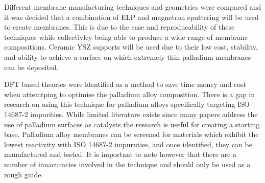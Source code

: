 Different membrane manufacturing techniques and geometries were compared and it was decided that a combination of ELP and magnetron sputtering will be used to create membranes. This is due to the ease and reproducability of these techniques while collectivley being able to produce a wide range of membrane compositions. Ceramic YSZ supports will be used due to their low cost, stability, and ability to achieve a surface on which extremely thin palladium membranes can be deposited.  

DFT based theories were identified as a method to save time money and cost when attemtping to optimise the palladium alloy composition. There is a gap in research on using this technique for palladium alloys specifically targeting ISO 14687-2 impurities. While limited literature exists since many papers address the use of palladium surfaces as catalysts the research is useful for creating a starting base. Palladium alloy membranes can be screened for materials which exhibit the lowest reactivity with ISO 14687-2 impuruties, and once identified, they can be manufactured and tested. It is important to note however that there are a number of innacuracies involved in the technique and should only be used as a rough guide. 





